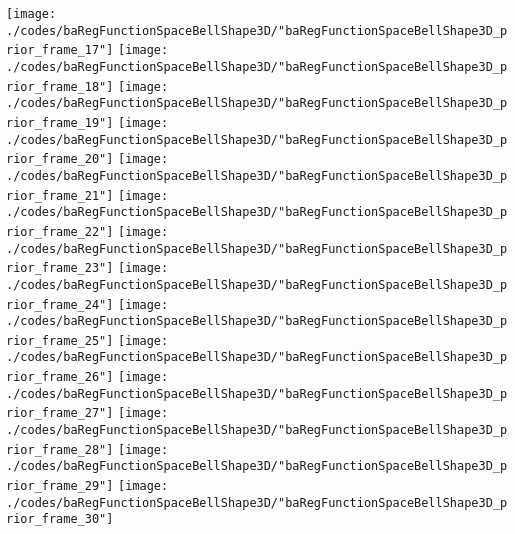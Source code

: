 \begin{frame}{\insertsection}
\begin{center}
{\begin{animateinline}{15}
				 \texttt{[image: ./codes/baRegFunctionSpaceBellShape3D/"baRegFunctionSpaceBellShape3D\_prior\_frame\_17"]}\newframe
				 \texttt{[image: ./codes/baRegFunctionSpaceBellShape3D/"baRegFunctionSpaceBellShape3D\_prior\_frame\_18"]}\newframe
				 \texttt{[image: ./codes/baRegFunctionSpaceBellShape3D/"baRegFunctionSpaceBellShape3D\_prior\_frame\_19"]}\newframe
				 \texttt{[image: ./codes/baRegFunctionSpaceBellShape3D/"baRegFunctionSpaceBellShape3D\_prior\_frame\_20"]}\newframe
				 \texttt{[image: ./codes/baRegFunctionSpaceBellShape3D/"baRegFunctionSpaceBellShape3D\_prior\_frame\_21"]}\newframe
				 \texttt{[image: ./codes/baRegFunctionSpaceBellShape3D/"baRegFunctionSpaceBellShape3D\_prior\_frame\_22"]}\newframe
				 \texttt{[image: ./codes/baRegFunctionSpaceBellShape3D/"baRegFunctionSpaceBellShape3D\_prior\_frame\_23"]}\newframe
				 \texttt{[image: ./codes/baRegFunctionSpaceBellShape3D/"baRegFunctionSpaceBellShape3D\_prior\_frame\_24"]}\newframe
				 \texttt{[image: ./codes/baRegFunctionSpaceBellShape3D/"baRegFunctionSpaceBellShape3D\_prior\_frame\_25"]}\newframe
				 \texttt{[image: ./codes/baRegFunctionSpaceBellShape3D/"baRegFunctionSpaceBellShape3D\_prior\_frame\_26"]}\newframe
				 \texttt{[image: ./codes/baRegFunctionSpaceBellShape3D/"baRegFunctionSpaceBellShape3D\_prior\_frame\_27"]}\newframe
				 \texttt{[image: ./codes/baRegFunctionSpaceBellShape3D/"baRegFunctionSpaceBellShape3D\_prior\_frame\_28"]}\newframe
				 \texttt{[image: ./codes/baRegFunctionSpaceBellShape3D/"baRegFunctionSpaceBellShape3D\_prior\_frame\_29"]}\newframe
				 \texttt{[image: ./codes/baRegFunctionSpaceBellShape3D/"baRegFunctionSpaceBellShape3D\_prior\_frame\_30"]}
			 \end{animateinline}
			}
	\end{center}
    
\end{frame}

